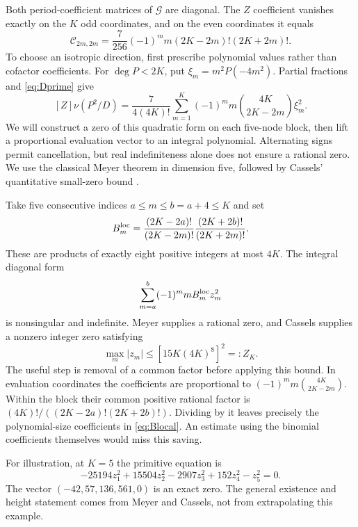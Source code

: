 Both period-coefficient matrices of $\mathcal G$ are diagonal. The
$Z$ coefficient vanishes exactly on the $K$ odd coordinates, and on
the even coordinates it equals
\begin{equation}\label{eq:fullC}
 \mathcal C_{2m,2m}
 =\frac7{256}(-1)^m m(2K-2m)!(2K+2m)!.
\end{equation}
To choose an isotropic direction, first prescribe polynomial values
rather than cofactor coefficients. For $\deg P<2K$, put
$\xi_m=m^2P(-4m^2)$. Partial fractions and \eqref{eq:Dprime} give
\[
 [Z]\nu(P^2/D)=\frac7{4(4K)!}
 \sum_{m=1}^K(-1)^m m\binom{4K}{2K-2m}\xi_m^2.
\]
We will construct a zero of this quadratic form on each five-node block,
then lift a proportional evaluation vector to an integral polynomial.
Alternating signs permit cancellation, but real indefiniteness alone
does not ensure a rational zero. We use the classical Meyer theorem
in dimension five, followed by Cassels' quantitative small-zero bound
\cite[Introduction and Theorem~1.1]{Fukshansky}.

Take five consecutive indices $a\leq m\leq b=a+4\leq K$ and set
\begin{equation}\label{eq:Blocal}
 B_m^{\rm loc}=
 \frac{(2K-2a)!}{(2K-2m)!}
 \frac{(2K+2b)!}{(2K+2m)!}.
\end{equation}
These are products of exactly eight positive integers at most $4K$.
The integral diagonal form
\[
 \sum_{m=a}^b(-1)^m mB_m^{\rm loc}z_m^2
\]
is nonsingular and indefinite. Meyer supplies a rational zero, and
Cassels supplies a nonzero integer zero satisfying
\begin{equation}\label{eq:Zheight}
 \max_m|z_m|\leq[15K(4K)^8]^2=:Z_K.
\end{equation}
The useful step is removal of a common factor before applying this
bound. In evaluation coordinates the coefficients are proportional to
$(-1)^m m\binom{4K}{2K-2m}$. Within the block their common positive
rational factor is
$(4K)!/((2K-2a)!(2K+2b)!)$. Dividing by it leaves precisely the
polynomial-size coefficients in \eqref{eq:Blocal}. An estimate using
the binomial coefficients themselves would miss this saving.

For illustration, at $K=5$ the primitive equation is
\[
 -25194z_1^2+15504z_2^2-2907z_3^2+152z_4^2-z_5^2=0.
\]
The vector $(-42,57,136,561,0)$ is an exact zero. The general
existence and height statement comes from Meyer and Cassels, not from
extrapolating this example.

